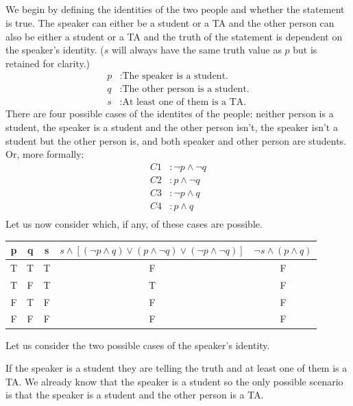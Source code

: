 \documentclass[11pt]{article}
\begin{document}
\subsection{} %
We begin by defining the identities of the two people and whether the statement is true. The speaker can either be a student or a TA and the other person can also be either a student or a TA and the truth of the statement is dependent on the speaker's identity. ($s$ will always have the same truth value as $p$ but is retained for clarity.) 
\begin{align*}
	p &: \text{The speaker is a student.} \\
	q &: \text{The other person is a student.} \\
	s &: \text{At least one of them is a TA.}
\end{align*}
There are four possible cases of the identites of the people: neither person is a student, the speaker is a student and the other person isn't, the speaker isn't a student but the other person is, and both speaker and other person are students. Or, more formally:
\begin{align*}
	C1 &: \neg{p} \land \neg{q} \\
	C2 &: p \land \neg{q} \\
	C3 &: \neg{p} \land q \\
	C4 &: p \land q \\
\end{align*}
Let us now consider which, if any, of these cases are possible. 
\begin{center}
\begin{tabular}{ c|c|c|c|c } 
	p & q & s & $s \land [(\neg{p} \land q) \lor (p \land \neg{q}) \lor (\neg{p} \land \neg{q})]$ & $\neg{s} \land (p \land q)$ \\ 
	\hline
	T & T & T & F & F \\
	T & F & T & T & F \\
	F & T & F & F & F \\
	F & F & F & F & F \\
\end{tabular}
\end{center}
Let us consider the two possible cases of the speaker's identity. 

If the speaker is a student they are telling the truth and at least one of them is a TA. We already know that the speaker is a student so the only possible scenario is that the speaker is a student and the other person is a TA. 
\end{document}
